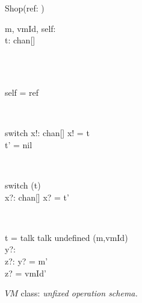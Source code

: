 \begin{figure}[H]
\centering
\begin{class}{Shop(ref: \integer)}
\\
\begin{state}
m, vmId, self: \integer
\\t: chan[\integer \times \integer]
\end{state} 
\\
\begin{init}
\\self = ref
\end{init} 
\\
\begin{op}{switch}
x!:  chan[\integer \times \integer]
\ST
x! = t
\\t' = nil
\end{op}
\\
\begin{op}{switch}
\Delta (t)
\\x?:  chan[\integer \times \integer]
\ST
x? = t'
\end{op}
\\
\begin{op}{ t = talk  talk  undefined}
\Delta (m,vmId)
\\y?: \integer
\\z?: \integer
\ST
y? = m'
\\z? = vmId'
\end{op}
\end{class}
\caption{$VM$ class: \textit{unfixed operation schema.}}
\label{fig_oz_unfixed_operation_schema_shop}
\end{figure}